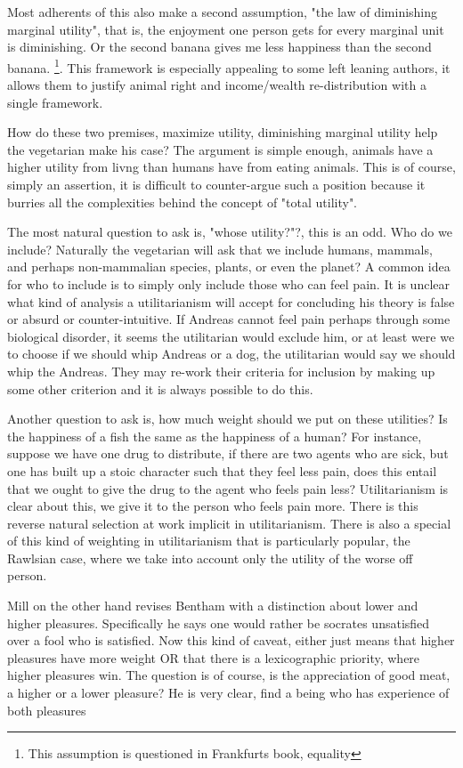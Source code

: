 \documentclass[12pt]{report}
\numberwithin{equation}{section}
\begin{document}
Most adherents of this also make a second assumption, "the law of diminishing marginal utility", that is, the enjoyment one person gets for every marginal unit is diminishing. Or the second banana gives me less happiness than the second banana. \footnote{This assumption is questioned in Frankfurts book, equality}. This framework is especially appealing to some left leaning authors, it allows them to justify animal right and income/wealth re-distribution with a single framework. 

How do these two premises, maximize utility, diminishing marginal utility help the vegetarian make his case? The argument is simple enough, animals have a higher utility from livng than humans have from eating animals. This is of course, simply an assertion, it is difficult to counter-argue such a position because it burries all the complexities behind the concept of "total utility". 

The most natural question to ask is, "whose utility?"?, this is an odd. Who do we include? Naturally the vegetarian will ask that we include humans, mammals, and perhaps non-mammalian species, plants, or even the planet? A common idea for who to include is to simply only include those who can feel pain. It is unclear what kind of analysis a utilitarianism will accept for concluding his theory is false or absurd or counter-intuitive. If Andreas cannot feel pain perhaps through some biological disorder, it seems the utilitarian would exclude him, or at least were we to choose if we should whip Andreas or a dog, the utilitarian would say we should whip the Andreas.  They may re-work their criteria for inclusion by making up some other criterion and it is always possible to do this. 

Another question to ask is, how much weight should we put on these utilities? Is the happiness of a fish the same as the happiness of a human? For instance, suppose we have one drug to distribute, if there are two agents who are sick, but one has built up a stoic character such that they feel less pain, does this entail that we ought to give the drug to the agent who feels pain less? Utilitarianism is clear about this, we give it to the person who feels pain more. There is this reverse natural selection at work implicit in utilitarianism. There is also a special of this kind of weighting in utilitarianism that is particularly popular, the Rawlsian case, where we take into account only the utility of the worse off person. 

Mill on the other hand revises Bentham with a distinction about lower and higher pleasures. Specifically he says one would rather be socrates unsatisfied over a fool who is satisfied. Now this kind of caveat, either just means that higher pleasures have more weight OR that there is a lexicographic priority, where higher pleasures win. The question is of course, is the appreciation of good meat, a higher or a lower pleasure? He is very clear, find a being who has experience of both pleasures 
\end{document}
